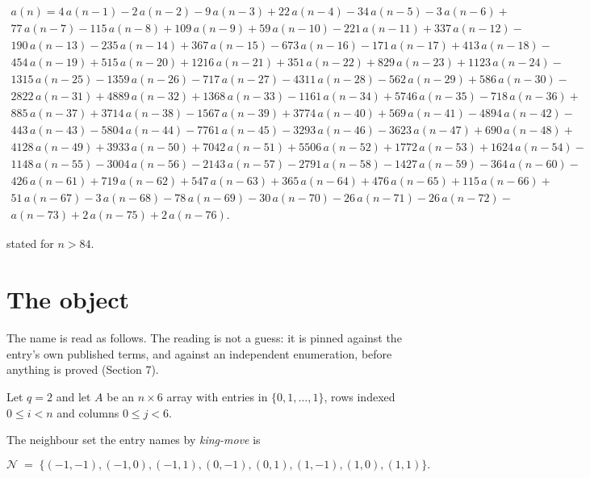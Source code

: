 \documentclass[11pt]{article}
\theoremstyle{definition}
\begin{document}
\begin{multline*} a(n) = 4\,a(n-1) - 2\,a(n-2) - 9\,a(n-3) + 22\,a(n-4) - 34\,a(n-5) - 3\,a(n-6) + \\ 77\,a(n-7) - 115\,a(n-8) + 109\,a(n-9) + 59\,a(n-10) - 221\,a(n-11) + 337\,a(n-12) - \\ 190\,a(n-13) - 235\,a(n-14) + 367\,a(n-15) - 673\,a(n-16) - 171\,a(n-17) + 413\,a(n-18) - \\ 454\,a(n-19) + 515\,a(n-20) + 1216\,a(n-21) + 351\,a(n-22) + 829\,a(n-23) + 1123\,a(n-24) - \\ 1315\,a(n-25) - 1359\,a(n-26) - 717\,a(n-27) - 4311\,a(n-28) - 562\,a(n-29) + 586\,a(n-30) - \\ 2822\,a(n-31) + 4889\,a(n-32) + 1368\,a(n-33) - 1161\,a(n-34) + 5746\,a(n-35) - 718\,a(n-36) + \\ 885\,a(n-37) + 3714\,a(n-38) - 1567\,a(n-39) + 3774\,a(n-40) + 569\,a(n-41) - 4894\,a(n-42) - \\ 443\,a(n-43) - 5804\,a(n-44) - 7761\,a(n-45) - 3293\,a(n-46) - 3623\,a(n-47) + 690\,a(n-48) + \\ 4128\,a(n-49) + 3933\,a(n-50) + 7042\,a(n-51) + 5506\,a(n-52) + 1772\,a(n-53) + 1624\,a(n-54) - \\ 1148\,a(n-55) - 3004\,a(n-56) - 2143\,a(n-57) - 2791\,a(n-58) - 1427\,a(n-59) - 364\,a(n-60) - \\ 426\,a(n-61) + 719\,a(n-62) + 547\,a(n-63) + 365\,a(n-64) + 476\,a(n-65) + 115\,a(n-66) + \\ 51\,a(n-67) - 3\,a(n-68) - 78\,a(n-69) - 30\,a(n-70) - 26\,a(n-71) - 26\,a(n-72) - \\ a(n-73) + 2\,a(n-75) + 2\,a(n-76). \end{multline*}

stated for $n > 84$.

\section{The object}

The name is read as follows. The reading is not a guess: it is pinned against the entry's own published terms, and against an independent enumeration, before anything is proved (Section 7).

Let $q = 2$ and let $A$ be an $n \times 6$ array with entries in $\{0,1,\dots,1\}$, rows indexed $0 \le i < n$ and columns $0 \le j < 6$.

The neighbour set the entry names by {\itshape king-move} is

\[\mathcal{N} \;=\; \{(-1,-1), (-1,0), (-1,1), (0,-1), (0,1), (1,-1), (1,0), (1,1)\}.\]
\end{document}
